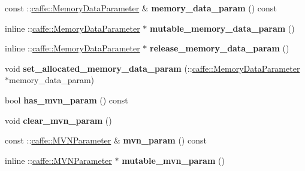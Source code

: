 \begin{DoxyCompactItemize}
const \+::\mbox{\hyperlink{classcaffe_1_1_memory_data_parameter}{caffe\+::\+Memory\+Data\+Parameter}} \& {\bfseries memory\+\_\+data\+\_\+param} () const
\item 
\mbox{\label{classcaffe_1_1_layer_parameter_a3d1f27360e8030789923cd526bd680d7}} 
inline \+::\mbox{\hyperlink{classcaffe_1_1_memory_data_parameter}{caffe\+::\+Memory\+Data\+Parameter}} $\ast$ {\bfseries mutable\+\_\+memory\+\_\+data\+\_\+param} ()
\item 
\mbox{\label{classcaffe_1_1_layer_parameter_aae7a0642c012d9222c2ddb1890f4ad2b}} 
inline \+::\mbox{\hyperlink{classcaffe_1_1_memory_data_parameter}{caffe\+::\+Memory\+Data\+Parameter}} $\ast$ {\bfseries release\+\_\+memory\+\_\+data\+\_\+param} ()
\item 
\mbox{\label{classcaffe_1_1_layer_parameter_ab55415cfbfc19f58c71b97d9badc793f}} 
void {\bfseries set\+\_\+allocated\+\_\+memory\+\_\+data\+\_\+param} (\+::\mbox{\hyperlink{classcaffe_1_1_memory_data_parameter}{caffe\+::\+Memory\+Data\+Parameter}} $\ast$memory\+\_\+data\+\_\+param)
\item 
\mbox{\label{classcaffe_1_1_layer_parameter_aa8f6756013cf866d91753fca7a337b84}} 
bool {\bfseries has\+\_\+mvn\+\_\+param} () const
\item 
\mbox{\label{classcaffe_1_1_layer_parameter_a9d943f2619a3434dccb655c1a61146d0}} 
void {\bfseries clear\+\_\+mvn\+\_\+param} ()
\item 
\mbox{\label{classcaffe_1_1_layer_parameter_a71d0e4ab203221f894eb6885a3aafbf1}} 
const \+::\mbox{\hyperlink{classcaffe_1_1_m_v_n_parameter}{caffe\+::\+M\+V\+N\+Parameter}} \& {\bfseries mvn\+\_\+param} () const
\item 
\mbox{\label{classcaffe_1_1_layer_parameter_a93328f412f2e27b328dec60622175bc3}} 
inline \+::\mbox{\hyperlink{classcaffe_1_1_m_v_n_parameter}{caffe\+::\+M\+V\+N\+Parameter}} $\ast$ {\bfseries mutable\+\_\+mvn\+\_\+param} ()
\item 
\mbox{\label{classcaffe_1_1_layer_parameter_a241f311fc35b36802914035d9ef006b4}} 

\end{DoxyCompactItemize}
